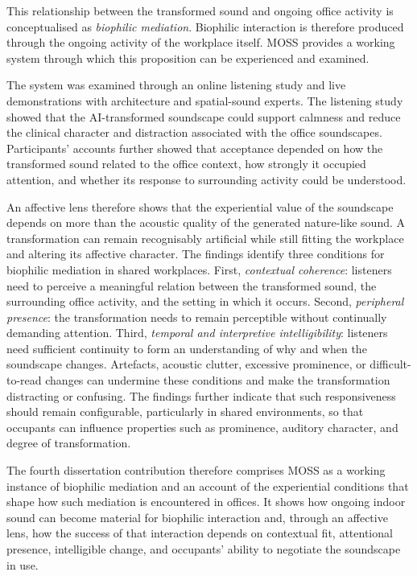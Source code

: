 This relationship between the transformed sound and ongoing office activity is conceptualised as \emph{biophilic mediation}. Biophilic interaction is therefore produced through the ongoing activity of the workplace itself. MOSS provides a working system through which this proposition can be experienced and examined.

The system was examined through an online listening study and live
demonstrations with architecture and spatial-sound experts. The
listening study showed that the AI-transformed soundscape could support
calmness and reduce the clinical character and distraction associated
with the office soundscapes. Participants' accounts further
showed that acceptance depended on how the transformed sound related to
the office context, how strongly it occupied attention, and whether its
response to surrounding activity could be understood.

An affective lens therefore shows that the experiential value of the
soundscape depends on more than the acoustic quality of the generated
nature-like sound. A transformation can remain recognisably artificial
while still fitting the workplace and altering its affective character.
The findings identify three conditions for biophilic mediation in shared
workplaces. First, \emph{contextual coherence}: listeners need to perceive
a meaningful relation between the transformed sound, the surrounding
office activity, and the setting in which it occurs. Second,
\emph{peripheral presence}: the transformation needs to remain
perceptible without continually demanding attention. Third,
\emph{temporal and interpretive intelligibility}: listeners need
sufficient continuity to form an understanding of why and when the
soundscape changes. Artefacts, acoustic clutter, excessive prominence,
or difficult-to-read changes can undermine these conditions and make
the transformation distracting or confusing. The findings further
indicate that such responsiveness should remain configurable,
particularly in shared environments, so that occupants can influence
properties such as prominence, auditory character, and degree of
transformation.

The fourth dissertation contribution therefore comprises MOSS as a
working instance of biophilic mediation and an account of the
experiential conditions that shape how such mediation is encountered in
offices. It shows how ongoing indoor sound can become
material for biophilic interaction and, through an affective lens, how
the success of that interaction depends on contextual fit, attentional
presence, intelligible change, and occupants' ability to negotiate the
soundscape in use.

